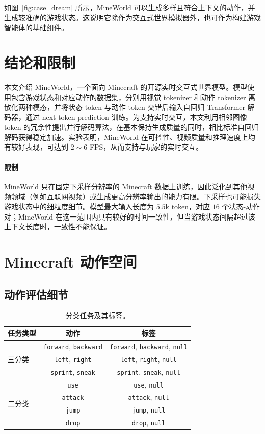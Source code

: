 \documentclass{article} %
\begin{document}
如图~\ref{fig:case_dream} 所示，MineWorld 可以生成多样且符合上下文的动作，并生成较准确的游戏状态。这说明它除作为交互式世界模拟器外，也可作为构建游戏智能体的基础组件。

\section{结论和限制}

本文介绍 MineWorld，一个面向 Minecraft 的开源实时交互式世界模型。模型使用包含游戏状态和对应动作的数据集，分别用视觉 tokenizer 和动作 tokenizer 离散化两种模态，并将状态 token 与动作 token 交错后输入自回归 Transformer 解码器，通过 next-token prediction 训练。为支持实时交互，本文利用相邻图像 token 的冗余性提出并行解码算法，在基本保持生成质量的同时，相比标准自回归解码获得稳定加速。实验表明，MineWorld 在可控性、视频质量和推理速度上均有较好表现，可达到 $2\sim6$ FPS，从而支持与玩家的实时交互。

\paragraph{限制}
MineWorld 只在固定下采样分辨率的 Minecraft 数据上训练，因此泛化到其他视频领域（例如互联网视频）或生成更高分辨率输出的能力有限。下采样也可能损失游戏状态中的细粒度细节。模型最大输入长度为 $5.5$k token，对应 $16$ 个状态-动作对；MineWorld 在这一范围内具有较好的时间一致性，但当游戏状态间隔超过该上下文长度时，一致性不能保证。




\newpage
\appendix

\section{Minecraft 动作空间}

\subsection{动作评估细节}

\begin{table}[htbp]
\centering
\caption{分类任务及其标签。}
\begin{tabular}{ l|c|c }
\toprule[1pt]
\textbf{任务类型} & \textbf{动作} & \textbf{标签} \\
\midrule
\multirow{3}{*}{三分类} & \texttt{forward}, \texttt{backward} & \texttt{forward}, \texttt{backward}, \texttt{null} \\
& \texttt{left}, \texttt{right} & \texttt{left}, \texttt{right}, \texttt{null} \\
& \texttt{sprint}, \texttt{sneak} & \texttt{sprint}, \texttt{sneak}, \texttt{null} \\
\midrule
\multirow{4}{*}{二分类} & \texttt{use} & \texttt{use}, \texttt{null} \\
& \texttt{attack} & \texttt{attack}, \texttt{null} \\
& \texttt{jump} & \texttt{jump}, \texttt{null} \\
& \texttt{drop} & \texttt{drop}, \texttt{null} \\
\bottomrule
\end{tabular}
\label{tab:subtask}
\end{table}
\end{document}

